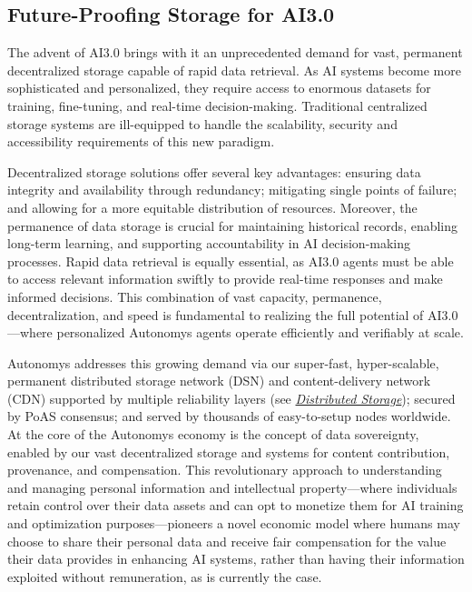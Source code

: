 \documentclass[conference]{IEEEtran}
\begin{document}


\subsection{Future-Proofing Storage for AI3.0}

The advent of AI3.0 brings with it an unprecedented demand for vast, permanent decentralized storage capable of rapid data retrieval. As AI systems become more sophisticated and personalized, they require access to enormous datasets for training, fine-tuning, and real-time decision-making. Traditional centralized storage systems are ill-equipped to handle the scalability, security and accessibility requirements of this new paradigm.

Decentralized storage solutions offer several key advantages: ensuring data integrity and availability through redundancy; mitigating single points of failure; and allowing for a more equitable distribution of resources. Moreover, the permanence of data storage is crucial for maintaining historical records, enabling long-term learning, and supporting accountability in AI decision-making processes. Rapid data retrieval is equally essential, as AI3.0 agents must be able to access relevant information swiftly to provide real-time responses and make informed decisions. This combination of vast capacity, permanence, decentralization, and speed is fundamental to realizing the full potential of AI3.0—where personalized Autonomys agents operate efficiently and verifiably at scale.

Autonomys addresses this growing demand via our super-fast, hyper-scalable, permanent distributed storage network (DSN) and content-delivery network (CDN) supported by multiple reliability layers (see \href{sec:dsn}{\textit{Distributed Storage}}); secured by PoAS consensus; and served by thousands of easy-to-setup nodes worldwide. At the core of the Autonomys economy is the concept of data sovereignty, enabled by our vast decentralized storage and systems for content contribution, provenance, and compensation. This revolutionary approach to understanding and managing personal information and intellectual property—where individuals retain control over their data assets and can opt to monetize them for AI training and optimization purposes—pioneers a novel economic model where humans may choose to share their personal data and receive fair compensation for the value their data provides in enhancing AI systems, rather than having their information exploited without remuneration, as is currently the case.
\end{document}
